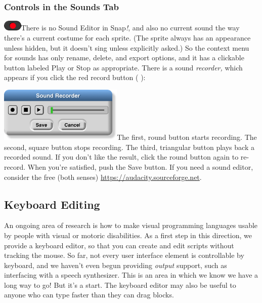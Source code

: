 \subsubsection{}\label{section-4}

\subsubsection{Controls in the Sounds
Tab}\label{controls-in-the-sounds-tab}

\includegraphics[width=0.35in,height=0.2in]{media/image1099.png}There is
no Sound Editor in Snap\emph{!}, and also no current sound the way
there's a current costume for each sprite. (The sprite always has an
appearance unless hidden, but it doesn't sing unless explicitly asked.)
So the context menu for sounds has only rename, delete, and export
options, and it has a clickable button labeled Play or Stop as
appropriate. There is a sound \emph{recorder,} which appears if you
click the red record button ( ):

\includegraphics[width=2.325in,height=1.03333in]{media/image1100.png}The
first, round button starts recording. The second, square button stops
recording. The third, triangular button plays back a recorded sound. If
you don't like the result, click the round button again to re-record.
When you're satisfied, push the Save button. If you need a sound editor,
consider the free (both senses)
\href{http://audacity.sourceforge.net}{https://audacity.sourceforge.net}.

\subsection{Keyboard Editing}\label{keyboard-editing}

An ongoing area of research is how to make visual programming languages
usable by people with visual or motoric disabilities. As a first step in
this direction, we provide a keyboard editor, so that you can create and
edit scripts without tracking the mouse. So far, not every user
interface element is controllable by keyboard, and we haven't even begun
providing \emph{output} support, such as interfacing with a speech
synthesizer. This is an area in which we know we have a long way to go!
But it's a start. The keyboard editor may also be useful to anyone who
can type faster than they can drag blocks.

